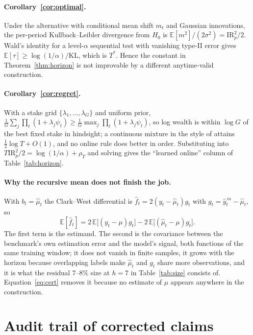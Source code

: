 \documentclass{article}
\theoremstyle{plain}
\theoremstyle{definition}
\begin{document}
\paragraph{Corollary~\ref{cor:optimal}.} Under the alternative with conditional mean shift
$m_t$ and Gaussian innovations, the per-period Kullback--Leibler divergence from $H_0$ is
$\mathbb{E}[m^2]/(2\sigma^2)=\mathrm{IR}_p^2/2$. Wald's identity for a level-$\alpha$
sequential test with vanishing type-II error gives
$\mathbb{E}[\tau]\ge\log(1/\alpha)/\mathrm{KL}$, which is $T^\ast$. Hence the constant in
Theorem~\ref{thm:horizon} is not improvable by a different anytime-valid construction.

\paragraph{Corollary~\ref{cor:regret}.} With a stake grid
$\{\lambda_1,\dots,\lambda_G\}$ and uniform prior, $\tfrac1G\sum_j\prod_t(1+\lambda_j\psi_t)
\ge \tfrac1G\max_j\prod_t(1+\lambda_j\psi_t)$, so log wealth is within $\log G$ of the best
fixed stake in hindsight; a continuous mixture in the style of \citet{cover1991} attains
$\tfrac12\log T+O(1)$, and no online rule does better in order. Substituting into
$T\mathrm{IR}_p^2/2=\log(1/\alpha)+\rho_T$ and solving gives the ``learned online'' column
of Table~\ref{tab:horizon}.

\paragraph{Why the recursive mean does not finish the job.} With $b_t=\hat\mu_t$ the
Clark--West differential is $\hat f_t=2(y_t-\hat\mu_t)g_t$ with $g_t=\hat y^{\,m}_t-\hat\mu_t$,
so
\[
  \mathbb{E}[\hat f_t]
  = 2\,\mathbb{E}\big[(y_t-\mu)g_t\big] - 2\,\mathbb{E}\big[(\hat\mu_t-\mu)g_t\big].
\]
The first term is the estimand. The second is the covariance between the benchmark's own
estimation error and the model's signal, both functions of the same training window; it does
not vanish in finite samples, it grows with the horizon because overlapping labels make
$\hat\mu_t$ and $g_t$ share more observations, and it is what the residual $7$--$8\%$ size at
$h=7$ in Table~\ref{tab:size} consists of. Equation~\eqref{eq:cert} removes it because no
estimate of $\mu$ appears anywhere in the construction.

\section{Audit trail of corrected claims}
\label{app:audit}
\end{document}
